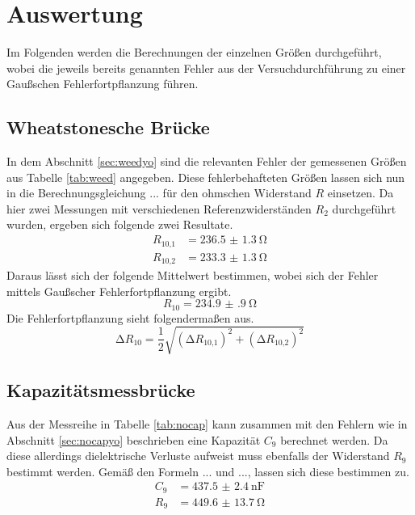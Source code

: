 \section{Auswertung}
Im Folgenden werden die Berechnungen der einzelnen Größen durchgeführt, wobei die jeweils bereits genannten Fehler aus der Versuchdurchführung zu einer
Gaußschen Fehlerfortpflanzung führen. 

\subsection{Wheatstonesche Brücke}
In dem Abschnitt \ref{sec:weedyo} sind die relevanten Fehler der gemessenen Größen aus Tabelle \ref{tab:weed} angegeben. Diese fehlerbehafteten Größen lassen sich nun in die Berechnungsgleichung ...
für den ohmschen Widerstand $R$ einsetzen.
Da hier zwei Messungen mit verschiedenen Referenzwiderständen $R_{2}$ durchgeführt wurden, ergeben sich folgende zwei Resultate.
\begin{align}
R_{10\text{,}1} &= \SI{236.5(13)}{\ohm} \\
R_{10\text{,}2} &= \SI{233.3(13)}{\ohm} 
\end{align}
Daraus lässt sich der folgende Mittelwert bestimmen, wobei sich der Fehler mittels Gaußscher Fehlerfortpflanzung ergibt.
\begin{equation}
R_{10} = \SI{234.9(9)}{\ohm}
\end{equation}
Die Fehlerfortpflanzung sieht folgendermaßen aus.
\begin{equation}
\increment R_{10} = \frac{1}{2} \sqrt{(\increment R_{10\text{,}1})^{2} + (\increment R_{10\text{,}2})^{2} }
\end{equation}



\subsection{Kapazitätsmessbrücke}
Aus der Messreihe in Tabelle \ref{tab:nocap} kann zusammen mit den Fehlern wie in Abschnitt \ref{sec:nocapyo} beschrieben eine Kapazität $C_{9}$ berechnet werden. Da diese allerdings dielektrische Verluste 
aufweist muss ebenfalls der Widerstand $R_{9}$ bestimmt werden. Gemäß den Formeln ... und ..., lassen sich diese bestimmen zu.
\begin{align}
C_{9} &= \SI{437.5(24)}{\nano\farad} \\
R_{9} &= \SI{449.6(137)}{\ohm} 
\end{align}

